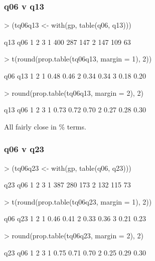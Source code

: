 \documentclass[11pt]{article}
\begin{document}
\subsubsection{q06 v q13}
\label{sec-1-2-2}
\begin{Schunk}
\begin{Sinput}
> (tq06q13 <- with(gp, table(q06, q13)))
\end{Sinput}
\begin{Soutput}
   q13
q06   1   2   3
  1 400 287 147
  2 147 109  63
\end{Soutput}
\begin{Sinput}
> t(round(prop.table(tq06q13, margin = 1), 2))
\end{Sinput}
\begin{Soutput}
   q06
q13    1    2
  1 0.48 0.46
  2 0.34 0.34
  3 0.18 0.20
\end{Soutput}
\begin{Sinput}
> round(prop.table(tq06q13, margin = 2), 2)
\end{Sinput}
\begin{Soutput}
   q13
q06    1    2    3
  1 0.73 0.72 0.70
  2 0.27 0.28 0.30
\end{Soutput}
\end{Schunk}

All fairly close in \% terms.
\subsubsection{q06 v q23}
\label{sec-1-2-3}
\begin{Schunk}
\begin{Sinput}
> (tq06q23 <- with(gp, table(q06, q23)))
\end{Sinput}
\begin{Soutput}
   q23
q06   1   2   3
  1 387 280 173
  2 132 115  73
\end{Soutput}
\begin{Sinput}
> t(round(prop.table(tq06q23, margin = 1), 2))
\end{Sinput}
\begin{Soutput}
   q06
q23    1    2
  1 0.46 0.41
  2 0.33 0.36
  3 0.21 0.23
\end{Soutput}
\begin{Sinput}
> round(prop.table(tq06q23, margin = 2), 2)
\end{Sinput}
\begin{Soutput}
   q23
q06    1    2    3
  1 0.75 0.71 0.70
  2 0.25 0.29 0.30
\end{Soutput}
\end{Schunk}
\end{document}

